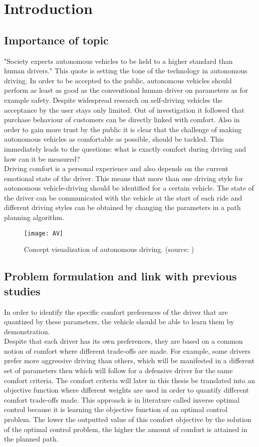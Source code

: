 \chapter{Introduction}
\label{cha:intro}
\section{Importance of topic}
"Society expects autonomous vehicles to be held to a higher standard than human drivers." \cite{Prof.Amnon} This quote is setting the tone of the technology in autonomous driving. In order to be accepted to the public, autonomous vehicles should perform as least as good as the conventional human driver on parameters as for example safety. Despite widespread research on self-driving vehicles the acceptance by the user stays only limited.\cite{Bae2019} Out of investigation it followed that purchase behaviour of customers can be directly linked with comfort. Also in order to gain more trust by the public it is clear that the challenge of making autonomous vehicles as comfortable as possible, should be tackled. This immediately leads to the questions: what is exactly comfort during driving and how can it be measured?\\
Driving comfort is a personal experience and also depends on the current emotional state of the driver. This means that more than one driving style for autonomous vehicle-driving should be identified for a certain vehicle. \cite{Eindhoven2019} The state of the driver can be communicated with the vehicle at the start of each ride and different driving styles can be obtained by changing the parameters in a path planning algorithm. 

\begin{figure}[h!]
	\centering
	\texttt{[image: AV]}
	\caption{Concept visualization of autonomous driving. (source: \cite{AV})}
	\label{fig:AV}
\end{figure} 
\newpage

\section{Problem formulation and link with previous studies}
In order to identify the specific comfort preferences of the driver that are quantized by these parameters, the vehicle should be able to learn them by demonstration. \cite{Kuderer2015a}\\
Despite that each driver has its own preferences, they are based on a common notion of comfort where different trade-offs are made. For example, some drivers prefer more aggressive driving than others, which will be manifested in a different set of parameters then which will follow for a defensive driver for the same comfort criteria. The comfort criteria will later in this thesis be translated into an objective function where different weights are used in order to quantify different comfort trade-offs made. This approach is in literature called inverse optimal control because it is learning the objective function of an optimal control problem. The lower the outputted value of this comfort objective by the solution of the optimal control problem, the higher the amount of comfort is attained in the planned path.\\

